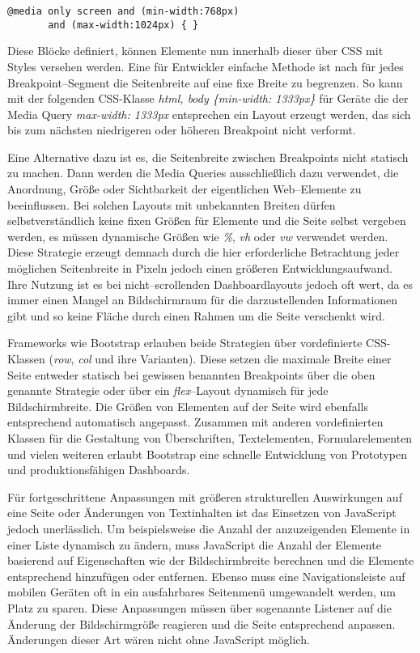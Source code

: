 \begin{verbatim}
@media only screen and (min-width:768px)
       and (max-width:1024px) { }
\end{verbatim}

Diese Blöcke definiert, können Elemente nun innerhalb dieser über \ac{CSS} mit Styles versehen werden.
Eine für Entwickler einfache Methode ist nach \autocite{JiangResponsiveWebDesignModeAndApplication.2014} für jedes Breakpoint--Segment die Seitenbreite auf eine fixe Breite zu begrenzen.
So kann mit der folgenden \acs{CSS}-Klasse \emph{html, body \{min-width: 1333px\}} für Geräte die der Media Query \emph{max-width: 1333px} entsprechen ein Layout erzeugt werden, das sich bis zum nächsten niedrigeren oder höheren Breakpoint nicht verformt.

Eine Alternative dazu ist es, die Seitenbreite zwischen Breakpoints nicht statisch zu machen.
Dann werden die Media Queries ausschließlich dazu verwendet, die Anordnung, Größe oder Sichtbarkeit der eigentlichen Web--Elemente zu beeinflussen.
\autocite[S. 33]{Laati.ImplementingResponsiveDesignInIndustrialDashboardEditor.2017} Bei solchen Layouts mit unbekannten Breiten dürfen selbstverständlich keine fixen Größen für Elemente und die Seite selbst vergeben werden, es müssen dynamische Größen wie \emph{\%}, \emph{vh} oder \emph{vw} verwendet werden.
Diese Strategie erzeugt demnach durch die hier erforderliche Betrachtung jeder möglichen Seitenbreite in Pixeln jedoch einen größeren Entwicklungsaufwand.
Ihre Nutzung ist es bei nicht--scrollenden Dashboardlayouts jedoch oft wert, da es immer einen Mangel an Bildschirmraum für die darzustellenden Informationen gibt und so keine Fläche durch einen Rahmen um die Seite verschenkt wird.

Frameworks wie Bootstrap \autocite{Bootstrap.BuildResponsiveSites.2024} erlauben beide Strategien über vordefinierte \acs{CSS}-Klassen (\emph{row}, \emph{col} und ihre Varianten).
Diese setzen die maximale Breite einer Seite entweder statisch bei gewissen benannten Breakpoints über die oben genannte Strategie oder über ein \emph{flex}--Layout dynamisch für jede Bildschirmbreite.
Die Größen von Elementen auf der Seite wird ebenfalls entsprechend automatisch angepasst.
Zusammen mit anderen vordefinierten Klassen für die Gestaltung von Überschriften, Textelementen, Formularelementen und vielen weiteren erlaubt Bootstrap eine schnelle Entwicklung von Prototypen und produktionsfähigen Dashboards.

\autocite[S. 72]{Harmsen.2018} Für fortgeschrittene Anpassungen mit größeren strukturellen Auswirkungen auf eine Seite oder Änderungen von Textinhalten ist das Einsetzen von JavaScript jedoch unerlässlich.
Um beispielsweise die Anzahl der anzuzeigenden Elemente in einer Liste dynamisch zu ändern, muss JavaScript die Anzahl der Elemente basierend auf Eigenschaften wie der Bildschirmbreite berechnen und die Elemente entsprechend hinzufügen oder entfernen.
Ebenso muss eine Navigationsleiste auf mobilen Geräten oft in ein ausfahrbares Seitenmenü umgewandelt werden, um Platz zu sparen.
Diese Anpassungen müssen über sogenannte Listener auf die Änderung der Bildschirmgröße reagieren und die Seite entsprechend anpassen.
Änderungen dieser Art wären nicht ohne JavaScript möglich.
